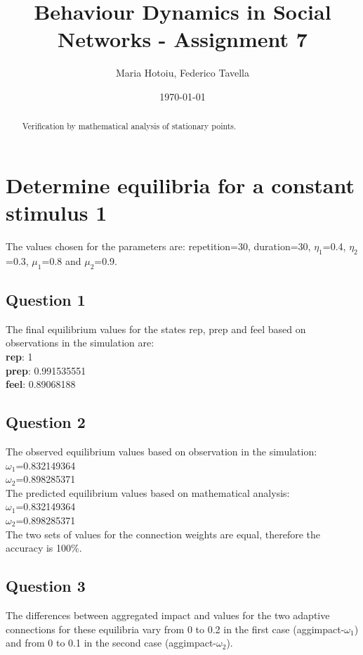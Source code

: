 \documentclass[a4paper]{article}
\title{Behaviour Dynamics in Social Networks - Assignment 7}
\author{Maria Hotoiu, Federico Tavella}
\date{\today}
\begin{document}
\maketitle

\begin{abstract}
Verification by mathematical analysis of stationary points.
\end{abstract}

\section{Determine equilibria for a constant stimulus 1}

The values chosen for the parameters are: repetition=30, duration=30, $\eta_{1}$=0.4, $\eta_{2}$=0.3, $\mu_{1}$=0.8 and $\mu_{2}$=0.9.

\subsection{Question 1}
The final equilibrium values for the states rep, prep and feel based on observations in the simulation are:\\
\textbf{rep}: 1 \\
\textbf{prep}: 0.991535551	\\
\textbf{feel}: 0.89068188

\subsection{Question 2}

The observed equilibrium values based on observation in the simulation:\\ 
$\omega_{1}$=0.832149364\\
$\omega_{2}$=0.898285371\\

The predicted equilibrium values based on mathematical analysis: \\
$\omega_{1}$=0.832149364\\
$\omega_{2}$=0.898285371\\

The two sets of values for the connection weights are equal, therefore the accuracy is 100\%.

\subsection{Question 3}

The differences between aggregated impact and values for the two adaptive connections for these equilibria vary from 0 to 0.2 in the first case (aggimpact-$\omega_{1}$) and from 0 to 0.1 in the second case (aggimpact-$\omega_{2}$). 
\end{document}
